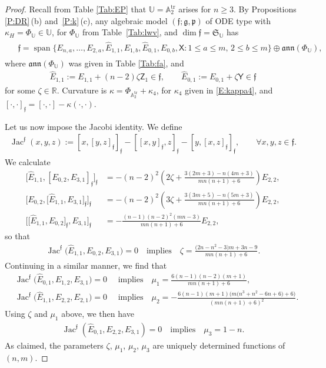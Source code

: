 \documentclass[10pt,a4paper]{amsart}
\DeclareMathOperator{\tr}{tr}
\DeclareMathOperator{\sn}{span}
\newcommand\Jac{\operatorname{Jac}}
\newcommand{\g}{\mathfrak{g}}
\newcommand\fann{\mathfrak{ann}}
\newcommand\ff{\mathfrak{f}}
\newcommand\fp{\mathfrak{p}}
\newcommand\fS{\mathfrak{S}}
\newcommand{\R}{\mathbb{R}}
\newcommand\bbU{\mathbb{U}}
\newcommand\bbA{\mathbb{A}}
\newcommand\sfX{\mathsf{X}}
\newcommand\sfY{\mathsf{Y}}
\newcommand\sfZ{\mathsf{Z}}
\numberwithin{equation}{section}
\begin{document}
\begin{proof}
Recall from Table \ref{Tab:EP} that $\bbU = \bbA_2^{\tr}$ arises for $n \ge 3$. By Propositions \ref{P:DR}\,(b) and~\ref{P:k}\,(c), any algebraic model $(\ff;\g, \fp)$ of ODE type with $\kappa_H = \Phi_\bbU \in \bbU$, for $\Phi_\bbU$ from Table~\ref{Tab:lwv}, and $\dim \ff = \fS_\bbU$ has
\begin{align}\label{E:fA2}
\begin{split}
&\ff = \sn\bigl\{E_{n,a},\dots, E_{2,a},\widehat{E}_{1,1},E_{1,b}, \widehat{E}_{0,1},E_{0,b}, \sfX \colon 1\le a \le m,\, 2 \le b \le m \bigr\} \oplus \fann (\Phi_\bbU),
\end{split}
\end{align}
 where $\fann (\Phi_\bbU)$ was given in Table \ref{Tab:fa}, and
\begin{align*}
\widehat{E}_{1,1} := E_{1,1} + (n-2)\zeta \sfZ_1 \in \ff, \qquad \widehat{E}_{0,1} := E_{0,1} + \zeta \sfY \in \ff
\end{align*}
 for some $\zeta \in \R$. Curvature is $\kappa =\Phi_{\bbA_2^{\tr}} + \kappa_4$, for $\kappa_4$ given in \eqref{E:kappa4}, and $[\cdot,\cdot]_\ff = [\cdot, \cdot] - \kappa(\cdot,\cdot)$.

Let us now impose the Jacobi identity. We define
\begin{align*} %
\Jac^\ff(x,y,z) := [x,[y,z]_{\ff}]_{\ff} -[[x,y]_{\ff}, z]_{\ff} -[y, [x, z]_{\ff}]_{\ff}, \qquad \forall x,y,z \in \ff.
\end{align*}
We calculate
\begin{align*}%
\big[\widehat{E}_{1,1},[E_{0,2},E_{3,1}]_\ff\big]_\ff &= -(n-2)^2\left( 2\zeta +\frac{3(2m+3)-n(4m+3)}{mn(n+1)+6} \right)E_{2,2},\\
\big[E_{0,2},\big[\widehat{E}_{1,1},E_{3,1}\big]_\ff\big]_\ff &= -(n-2)^2\left(3\zeta +\frac{3(3m+5)-n(5m+3)}{mn(n+1)+6} \right)E_{2,2}, \\
\big[\big[\widehat{E}_{1,1},E_{0,2}\big]_\ff,E_{3,1}\big]_\ff &= -\frac{(n-1)(n-2)^2(mn-3)}{mn(n+1)+6}E_{2,2},
\end{align*}
so that
\begin{align}\label{E:zeta}
\Jac^\ff\bigl(\widehat{E}_{1,1}, E_{0,2},E_{3,1}\bigr) = 0 \quad \text{implies}\quad \zeta= \frac{\bigl(2n-n^2-3\bigr)m + 3n-9}{mn(n+1)+6}.
\end{align}
 Continuing in a similar manner, we find that
\begin{align}
& \Jac^\ff\bigl(\widehat{E}_{0,1}, E_{1,2},E_{3,1}\bigr) = 0 \quad \text{ implies}\quad \mu_1 = \frac{6(n-1)(n-2)(m+1)}{mn(n+1)+6},\label{E:mu}\\
& \Jac^\ff\bigl(\widehat{E}_{1,1}, E_{2,2},E_{2,1}\bigr) = 0 \quad \text{ implies}\quad \mu_2 = -\frac{6(n-1)(m+1)\bigl(m\bigl(n^3 + n^2-6n + 6\bigr) + 6\bigr)}{(mn(n+1)+6)^2}.\nonumber
\end{align}
Using $\zeta$ and $\mu_1$ above, we then have
\begin{align}\label{E:mu3}
\Jac^\ff(\widehat{E}_{0,1}, E_{2,2},E_{3,1}) = 0 \quad \text{implies} \quad \mu_3= 1-n.
\end{align}
As claimed, the parameters $\zeta$, $\mu_1$, $\mu_2$, $\mu_3$ are uniquely determined functions of $(n,m)$.


\end{proof}
\end{document}

